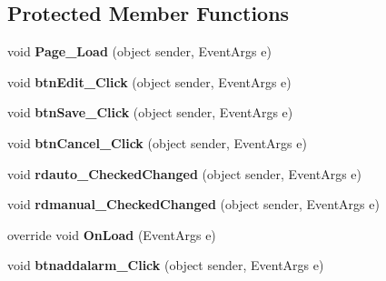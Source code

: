 \subsection*{Protected Member Functions}
\begin{DoxyCompactItemize}
\item 
\hypertarget{classusertrackmyhealth__sleep__settings_aa7d7036070e74f740770eef11e87fcab}{void {\bfseries Page\-\_\-\-Load} (object sender, Event\-Args e)}\label{classusertrackmyhealth__sleep__settings_aa7d7036070e74f740770eef11e87fcab}

\item 
\hypertarget{classusertrackmyhealth__sleep__settings_a0b377e312afbc9aa10f1c8238982fca4}{void {\bfseries btn\-Edit\-\_\-\-Click} (object sender, Event\-Args e)}\label{classusertrackmyhealth__sleep__settings_a0b377e312afbc9aa10f1c8238982fca4}

\item 
\hypertarget{classusertrackmyhealth__sleep__settings_aab58273282e419320c31f9a4e85b04c6}{void {\bfseries btn\-Save\-\_\-\-Click} (object sender, Event\-Args e)}\label{classusertrackmyhealth__sleep__settings_aab58273282e419320c31f9a4e85b04c6}

\item 
\hypertarget{classusertrackmyhealth__sleep__settings_a252d010ba19c46913dabf243d580e12b}{void {\bfseries btn\-Cancel\-\_\-\-Click} (object sender, Event\-Args e)}\label{classusertrackmyhealth__sleep__settings_a252d010ba19c46913dabf243d580e12b}

\item 
\hypertarget{classusertrackmyhealth__sleep__settings_a3e7d7abbb91d547d6b874d596e12bf93}{void {\bfseries rdauto\-\_\-\-Checked\-Changed} (object sender, Event\-Args e)}\label{classusertrackmyhealth__sleep__settings_a3e7d7abbb91d547d6b874d596e12bf93}

\item 
\hypertarget{classusertrackmyhealth__sleep__settings_a55219a0866d2cf5a64ebbbd0a7205b69}{void {\bfseries rdmanual\-\_\-\-Checked\-Changed} (object sender, Event\-Args e)}\label{classusertrackmyhealth__sleep__settings_a55219a0866d2cf5a64ebbbd0a7205b69}

\item 
\hypertarget{classusertrackmyhealth__sleep__settings_a4dedaf92205ea1e7f0092a60b20a7495}{override void {\bfseries On\-Load} (Event\-Args e)}\label{classusertrackmyhealth__sleep__settings_a4dedaf92205ea1e7f0092a60b20a7495}

\item 
\hypertarget{classusertrackmyhealth__sleep__settings_adbb24e3754ddb5c1419b82ffd5291c8e}{void {\bfseries btnaddalarm\-\_\-\-Click} (object sender, Event\-Args e)}\label{classusertrackmyhealth__sleep__settings_adbb24e3754ddb5c1419b82ffd5291c8e}

\end{DoxyCompactItemize}


